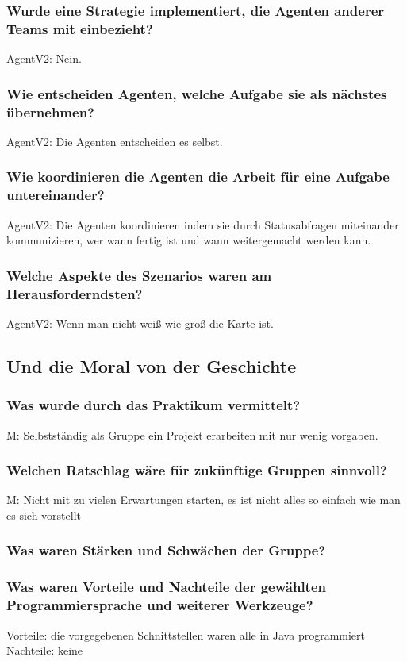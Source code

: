 \documentclass[runningheads]{llncs}
\begin{document}
\subsubsection{Wurde eine Strategie implementiert, die Agenten anderer Teams mit einbezieht?\\}
AgentV2: Nein.
\subsubsection{Wie entscheiden Agenten, welche Aufgabe sie als nächstes übernehmen?\\}
AgentV2: Die Agenten entscheiden es selbst.
\subsubsection{Wie koordinieren die Agenten die Arbeit für eine Aufgabe untereinander?\\}
AgentV2: Die Agenten koordinieren indem sie durch Statusabfragen miteinander kommunizieren, wer wann fertig ist und wann weitergemacht werden kann. 
\subsubsection{Welche Aspekte des Szenarios waren am Herausforderndsten?\\}
AgentV2: Wenn man nicht weiß wie groß die Karte ist.
\subsection{Und die Moral von der Geschichte}
\subsubsection{Was wurde durch das Praktikum vermittelt?\\}
M: Selbstständig als Gruppe ein Projekt erarbeiten mit nur wenig vorgaben.
\subsubsection{Welchen Ratschlag wäre für zukünftige Gruppen sinnvoll?\\}
M: Nicht mit zu vielen Erwartungen starten, es ist nicht alles so einfach wie man es sich vorstellt
\subsubsection{Was waren Stärken und Schwächen der Gruppe?\\}
\subsubsection{Was waren Vorteile und Nachteile der gewählten Programmiersprache und weiterer Werkzeuge?\\}
Vorteile: die vorgegebenen Schnittstellen waren alle in Java programmiert\\
Nachteile: keine
\end{document}
